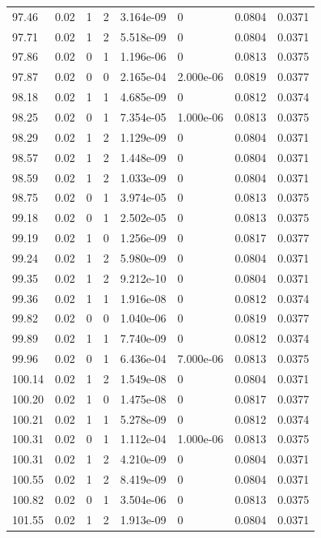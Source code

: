 \documentclass[preview]{standalone}
\begin{document}
{{{{{{{{{{{{{{{\begin{tabular}{L{1.2cm}C{1.2cm} C{0.3cm}C{0.5cm} C{1.4cm}C{1.4cm} C{1.4cm}C{1.4cm}}
  97.46  &  0.02  & 1     &  2 &  3.164e-09  & 0  & 0.0804 &  0.0371   \\ 
  97.71  &  0.02  & 1     &  2 &  5.518e-09  & 0  & 0.0804 &  0.0371   \\ 
  97.86  &  0.02  & 0     &  1 &  1.196e-06  & 0  & 0.0813 &  0.0375   \\ 
  97.87  &  0.02  & 0     &  0 &  2.165e-04  & 2.000e-06  & 0.0819 &  0.0377   \\ 
  98.18  &  0.02  & 1     &  1 &  4.685e-09  & 0  & 0.0812 &  0.0374   \\ 
  98.25  &  0.02  & 0     &  1 &  7.354e-05  & 1.000e-06  & 0.0813 &  0.0375   \\ 
  98.29  &  0.02  & 1     &  2 &  1.129e-09  & 0  & 0.0804 &  0.0371   \\ 
  98.57  &  0.02  & 1     &  2 &  1.448e-09  & 0  & 0.0804 &  0.0371   \\ 
  98.59  &  0.02  & 1     &  2 &  1.033e-09  & 0  & 0.0804 &  0.0371   \\ 
  98.75  &  0.02  & 0     &  1 &  3.974e-05  & 0  & 0.0813 &  0.0375   \\ 
  99.18  &  0.02  & 0     &  1 &  2.502e-05  & 0  & 0.0813 &  0.0375   \\ 
  99.19  &  0.02  & 1     &  0 &  1.256e-09  & 0  & 0.0817 &  0.0377   \\ 
  99.24  &  0.02  & 1     &  2 &  5.980e-09  & 0  & 0.0804 &  0.0371   \\ 
  99.35  &  0.02  & 1     &  2 &  9.212e-10  & 0  & 0.0804 &  0.0371   \\ 
  99.36  &  0.02  & 1     &  1 &  1.916e-08  & 0  & 0.0812 &  0.0374   \\ 
  99.82  &  0.02  & 0     &  0 &  1.040e-06  & 0  & 0.0819 &  0.0377   \\ 
  99.89  &  0.02  & 1     &  1 &  7.740e-09  & 0  & 0.0812 &  0.0374   \\ 
  99.96  &  0.02  & 0     &  1 &  6.436e-04  & 7.000e-06  & 0.0813 &  0.0375   \\ 
  100.14  &  0.02  & 1     &  2 &  1.549e-08  & 0  & 0.0804 &  0.0371   \\ 
  100.20  &  0.02  & 1     &  0 &  1.475e-08  & 0  & 0.0817 &  0.0377   \\ 
  100.21  &  0.02  & 1     &  1 &  5.278e-09  & 0  & 0.0812 &  0.0374   \\ 
  100.31  &  0.02  & 0     &  1 &  1.112e-04  & 1.000e-06  & 0.0813 &  0.0375   \\ 
  100.31  &  0.02  & 1     &  2 &  4.210e-09  & 0  & 0.0804 &  0.0371   \\ 
  100.55  &  0.02  & 1     &  2 &  8.419e-09  & 0  & 0.0804 &  0.0371   \\ 
  100.82  &  0.02  & 0     &  1 &  3.504e-06  & 0  & 0.0813 &  0.0375   \\ 
  101.55  &  0.02  & 1     &  2 &  1.913e-09  & 0  & 0.0804 &  0.0371   \\ 
\hline 
\end{tabular} 

}}}}}}}}}}}}}}}
\end{document}
